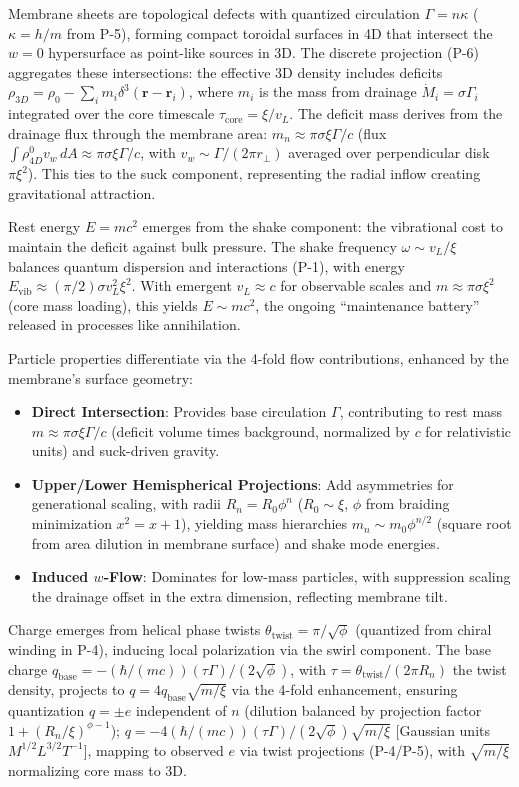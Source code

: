 Membrane sheets are topological defects with quantized circulation $\Gamma = n \kappa$ ($\kappa = h / m$ from P-5), forming compact toroidal surfaces in 4D that intersect the $w=0$ hypersurface as point-like sources in 3D. The discrete projection (P-6) aggregates these intersections: the effective 3D density includes deficits $\rho_{3D} = \rho_0 - \sum_i m_i \delta^3(\mathbf{r} - \mathbf{r}_i)$, where $m_i$ is the mass from drainage $\dot{M}_i = \sigma \Gamma_i$ integrated over the core timescale $\tau_{\text{core}} = \xi / v_L$. The deficit mass derives from the drainage flux through the membrane area: $m_n \approx \pi \sigma \xi \Gamma / c$ (flux $\int \rho_{4D}^0 v_w \, dA \approx \pi \sigma \xi \Gamma / c$, with $v_w \sim \Gamma / (2\pi r_\perp)$ averaged over perpendicular disk $\pi \xi^2$). This ties to the suck component, representing the radial inflow creating gravitational attraction.

Rest energy $E = m c^2$ emerges from the shake component: the vibrational cost to maintain the deficit against bulk pressure. The shake frequency $\omega \sim v_L / \xi$ balances quantum dispersion and interactions (P-1), with energy $E_{\text{vib}} \approx (\pi/2) \sigma v_L^2 \xi^2$. With emergent $v_L \approx c$ for observable scales and $m \approx \pi \sigma \xi^2$ (core mass loading), this yields $E \sim m c^2$, the ongoing ``maintenance battery'' released in processes like annihilation.

Particle properties differentiate via the 4-fold flow contributions, enhanced by the membrane's surface geometry:
\begin{itemize}
\item \textbf{Direct Intersection}: Provides base circulation $\Gamma$, contributing to rest mass $m \approx \pi \sigma \xi \Gamma / c$ (deficit volume times background, normalized by $c$ for relativistic units) and suck-driven gravity.
\item \textbf{Upper/Lower Hemispherical Projections}: Add asymmetries for generational scaling, with radii $R_n = R_0 \phi^n$ ($R_0 \sim \xi$, $\phi$ from braiding minimization $x^2 = x + 1$), yielding mass hierarchies $m_n \sim m_0 \phi^{n/2}$ (square root from area dilution in membrane surface) and shake mode energies.
\item \textbf{Induced $w$-Flow}: Dominates for low-mass particles, with suppression scaling the drainage offset in the extra dimension, reflecting membrane tilt.
\end{itemize}

Charge emerges from helical phase twists $\theta_{\text{twist}} = \pi / \sqrt{\phi}$ (quantized from chiral winding in P-4), inducing local polarization via the swirl component. The base charge $q_{\text{base}} = - (\hbar / (m c)) (\tau \Gamma) / (2 \sqrt{\phi})$, with $\tau = \theta_{\text{twist}} / (2 \pi R_n)$ the twist density, projects to $q = 4 q_{\text{base}} \sqrt{m / \xi}$ via the 4-fold enhancement, ensuring quantization $q = \pm e$ independent of $n$ (dilution balanced by projection factor $1 + (R_n / \xi)^{\phi - 1}$); $q = -4 (\hbar / (m c)) (\tau \Gamma) / (2 \sqrt{\phi}) \sqrt{m / \xi}$ [Gaussian units $M^{1/2} L^{3/2} T^{-1}$], mapping to observed $e$ via twist projections (P-4/P-5), with $\sqrt{m / \xi}$ normalizing core mass to 3D.

